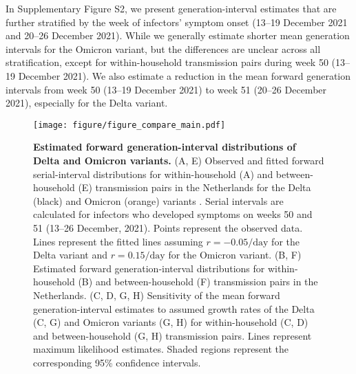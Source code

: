 \documentclass[12pt]{article}
\begin{document}
In Supplementary Figure S2, we present generation-interval estimates that are further stratified by the week of infectors' symptom onset (13--19 December 2021 and 20--26 December 2021).
While we generally estimate shorter mean generation intervals for the Omicron variant, but the differences are unclear across all stratification, except for within-household transmission pairs during week 50 (13--19 December 2021).
We also estimate a reduction in the mean forward generation intervals from week 50 (13--19 December 2021) to week 51 (20--26 December 2021), especially for the Delta variant. 

\begin{figure}[!th]
\texttt{[image: figure/figure\_compare\_main.pdf]}
\caption{
\textbf{Estimated forward generation-interval distributions of Delta and Omicron variants.}
(A, E) Observed and fitted forward serial-interval distributions for within-household (A) and between-household (E) transmission pairs in the Netherlands for the Delta (black) and Omicron (orange) variants \citep{backer2021omicron}.
Serial intervals are calculated for infectors who developed symptoms on weeks 50 and 51 (13--26 December, 2021).
Points represent the observed data.
Lines represent the fitted lines assuming $r=-0.05/\textrm{day}$ for the Delta variant and $r=0.15/\textrm{day}$ for the Omicron variant.
(B, F) Estimated forward generation-interval distributions for within-household (B) and between-household (F) transmission pairs in the Netherlands.
(C, D, G, H) Sensitivity of the mean forward generation-interval estimates to assumed growth rates of the Delta (C, G) and Omicron variants (G, H) for within-household (C, D) and between-household (G, H) transmission pairs.
Lines represent maximum likelihood estimates.
Shaded regions represent the corresponding 95\% confidence intervals.
\label{fig:serial}
}
\end{figure}
\end{document}
